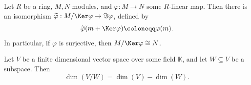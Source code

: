 \begin{theorem}\label{thm:first-iso}
	Let $R$ be a ring, $M,N$ modules, and $\varphi : M \to N$ some $R$-linear map. Then there is an isomorphism $\widetilde{\varphi } : M / \Ker \varphi  \to \Im \varphi $, defined by
	\[
		\widetilde{\varphi } (m+\Ker \varphi ) \coloneqq \varphi (m)
	.\]
	In particular, if $\varphi $ is surjective, then $M / \Ker \varphi \cong N$.
\end{theorem}

\begin{theorem}\label{cor:dimension}
	Let $V$ be a finite dimensional vector space over some field $\mathbb{K} $, and let $W\subseteq V$ be a subspace. Then
	\[
		\dim (V/W) = \dim (V) - \dim (W)
	.\]
\end{theorem}
